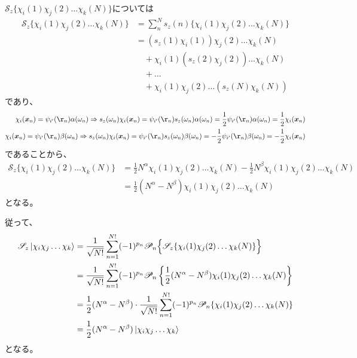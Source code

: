 $\mathscr{S}_z\{\chi_i(1) \chi_j(2) \dots \chi_k(N)\}$については
\begin{align}
	\mathscr{S}_z\{
		\chi_i(1) \chi_j(2) \dots \chi_k(N)
	\}
&=
	\sum_n^N
		s_z(n)\{
			\chi_i(1) \chi_j(2) \dots \chi_k(N)
		\} \\
%
%
&=
	(s_z(1) \chi_i(1)) \chi_j(2) \dots \chi_k(N) \nonumber \\ &\quad
	+
	\chi_i(1) (s_z(2) \chi_j(2)) \dots \chi_k(N) \nonumber \\ &\quad
	+
	\dots \nonumber \\ &\quad
	+
	\chi_i(1) \chi_j(2) \dots (s_z(N) \chi_k(N))
\end{align}
であり、
\begin{align}
	\chi_i(\x_n)
=
	\psi_{i'}(\r_n) \alpha(\omega_n)
\Rightarrow
	s_z(\omega_n) \chi_i(\x_n)
=
	\psi_{i'}(\r_n) s_z(\omega_n) \alpha(\omega_n)
=
	\frac{1}{2} \psi_{i'}(\r_n) \alpha(\omega_n)
=
	\frac{1}{2} \chi_i(\x_n) \\
%
%
	\chi_i(\x_n)
=
	\psi_{i'}(\r_n) \beta(\omega_n)
\Rightarrow
	s_z(\omega_n) \chi_i(\x_n)
=
	\psi_{i'}(\r_n) s_z(\omega_n) \beta(\omega_n)
=
	-
	\frac{1}{2} \psi_{i'}(\r_n) \beta(\omega_n)
=
	-
	\frac{1}{2} \chi_i(\x_n)
\end{align}
であることから、
\begin{align}
	\mathscr{S}_z\{
		\chi_i(1) \chi_j(2) \dots \chi_k(N)
	\}
&=
	\frac{1}{2} N^{\alpha}
	\chi_i(1) \chi_j(2) \dots \chi_k(N)
	-
	\frac{1}{2} N^{\beta}
	\chi_i(1) \chi_j(2) \dots \chi_k(N) \\
%
%
&=
	\frac{1}{2}
	(N^{\alpha} -N^{\beta})
	\chi_i(1) \chi_j(2) \dots \chi_k(N)
\end{align}
となる。

従って、
\begin{align}
	\mathscr{S}_z\ket{\chi_i\chi_j\dots\chi_k}
&=
	\frac{1}{\sqrt{N!}}
	\sum_{n=1}^{N!}
		(-1)^{p_n}
		\mathscr{P}_n\Bigl\{
			\mathscr{S}_z\{
				\chi_i(1) \chi_j(2) \dots \chi_k(N)
			\}
		\Bigr\} \\
%
%
&=
	\frac{1}{\sqrt{N!}}
	\sum_{n=1}^{N!}
		(-1)^{p_n}
		\mathscr{P}_n\left\{
			\frac{1}{2}
			(N^{\alpha} -N^{\beta})
			\chi_i(1) \chi_j(2) \dots \chi_k(N)
		\right\} \\
%
%
&=
	\frac{1}{2}
	(N^{\alpha} -N^{\beta}) \cdot
	\frac{1}{\sqrt{N!}}
	\sum_{n=1}^{N!}
		(-1)^{p_n}
		\mathscr{P}_n\{
			\chi_i(1) \chi_j(2) \dots \chi_k(N)
		\} \\
%
%
&=
	\frac{1}{2}
	(N^{\alpha} -N^{\beta})
	\ket{\chi_i\chi_j\dots\chi_k}
\end{align}
となる。


